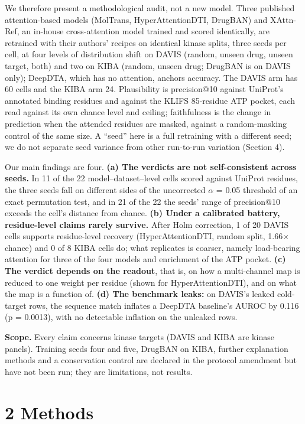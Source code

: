 We therefore present a methodological audit, not a new model. Three published attention-based models (MolTrans, HyperAttentionDTI, DrugBAN) and XAttn-Ref, an in-house cross-attention model trained and scored identically, are retrained with their authors' recipes on identical kinase splits, three seeds per cell, at four levels of distribution shift on DAVIS (random, unseen drug, unseen target, both) and two on KIBA (random, unseen drug; DrugBAN is on DAVIS only); DeepDTA, which has no attention, anchors accuracy. The DAVIS arm has 60 cells and the KIBA arm 24. Plausibility is precision@10 against UniProt's annotated binding residues and against the KLIFS 85-residue ATP pocket, each read against its own chance level and ceiling; faithfulness is the change in prediction when the attended residues are masked, against a random-masking control of the same size. A ``seed'' here is a full retraining with a different seed; we do not separate seed variance from other run-to-run variation (Section 4).

Our main findings are four. \textbf{(a) The verdicts are not self-consistent across seeds.} In 11 of the 22 model--dataset--level cells scored against UniProt residues, the three seeds fall on different sides of the uncorrected $\alpha$ = 0.05 threshold of an exact permutation test, and in 21 of the 22 the seeds' range of precision@10 exceeds the cell's distance from chance. \textbf{(b) Under a calibrated battery, residue-level claims rarely survive.} After Holm correction, 1 of 20 DAVIS cells supports residue-level recovery (HyperAttentionDTI, random split, 1.66$\times$ chance) and 0 of 8 KIBA cells do; what replicates is coarser, namely load-bearing attention for three of the four models and enrichment of the ATP pocket. \textbf{(c) The verdict depends on the readout}, that is, on how a multi-channel map is reduced to one weight per residue (shown for HyperAttentionDTI), and on what the map is a function of. \textbf{(d) The benchmark leaks:} on DAVIS's leaked cold-target rows, the sequence match inflates a DeepDTA baseline's AUROC by 0.116 (p = 0.0013), with no detectable inflation on the unleaked rows.

\textbf{Scope.} Every claim concerns kinase targets (DAVIS and KIBA are kinase panels). Training seeds four and five, DrugBAN on KIBA, further explanation methods and a conservation control are declared in the protocol amendment but have not been run; they are limitations, not results.

\section{2 Methods}\label{methods}

